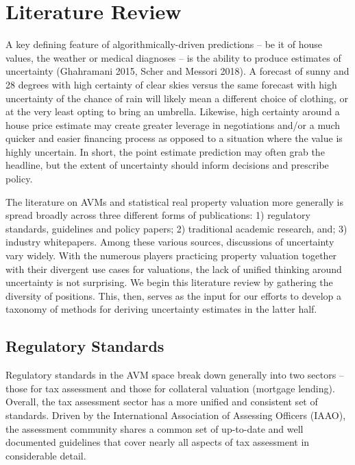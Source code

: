 \documentclass[colTwo]{format}
\theoremstyle{definition}
\begin{document}
\section{Literature Review}

A key defining feature of algorithmically-driven predictions -- be it of house values, the weather or medical diagnoses -- is the ability to produce estimates of uncertainty (Ghahramani 2015, Scher and Messori 2018).  A forecast of sunny and 28 degrees with high certainty of clear skies versus the same forecast with high uncertainty of the chance of rain will likely mean a different choice of clothing, or at the very least opting to bring an umbrella.  Likewise, high certainty around a house price estimate may create greater leverage in negotiations and/or a much quicker and easier financing process as opposed to a situation where the value is highly uncertain.  In short, the point estimate prediction may often grab the headline, but the extent of uncertainty should inform decisions and prescribe policy.   

The literature on AVMs and statistical real property valuation more generally is spread broadly across three different forms of publications: 1) regulatory standards, guidelines and policy papers; 2) traditional academic research, and; 3) industry whitepapers.  Among these various sources, discussions of uncertainty vary widely.  With the numerous players practicing property valuation together with their divergent use cases for valuations, the lack of unified thinking around uncertainty is not surprising.  We begin this literature review by gathering the diversity of positions.  This, then, serves as the input for our efforts to develop a taxonomy of methods for deriving uncertainty estimates in the latter half.     

\subsection{Regulatory Standards}

Regulatory standards in the AVM space break down generally into two sectors -- those for tax assessment and those for collateral valuation (mortgage lending).  Overall, the tax assessment sector has a more unified and consistent set of standards.  Driven by the International Association of Assessing Officers (IAAO), the assessment community shares a common set of up-to-date and well documented guidelines that cover nearly all aspects of tax assessment in considerable detail.  
\end{document}
